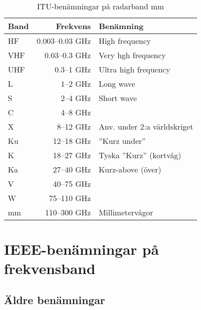 \begin{table}[H]
\centering

\begin{tabular}{lrl}
	\textbf{Band} & \textbf{Frekvens} & \textbf{Benämning}          \\ \hline
	HF            &   0.003--0.03 GHz & High frequency              \\
	VHF           &     0.03--0.3 GHz & Very hgh frequency          \\
	UHF           &        0.3--1 GHz & Ultra high frequency        \\
	L             &          1--2 GHz & Long wave                   \\
	S             &          2--4 GHz & Short wave                  \\
	C             &          4--8 GHz &  \\
	X             &         8--12 GHz & Anv. under 2:a världskriget \\
	Ku            &        12--18 GHz & ''Kurz under''              \\
	K             &        18--27 GHz & Tyska ''Kurz'' (kortvåg)    \\
	Ka            &        27--40 GHz & Kurz-above (över)           \\
	V             &        40--75 GHz &  \\
	W             &       75--110 GHz &  \\
	mm            &      110--300 GHz & Millimetervågor
\end{tabular}
\caption{ITU-benämningar på radarband mm}
\end{table}

\section{IEEE-benämningar på frekvensband}
\label{sec:IEEE-benamningar}

\subsection{Äldre benämningar}

